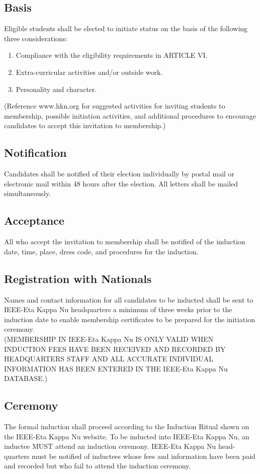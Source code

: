 \documentclass[10pt, oneside]{article}
\begin{document}
\subsection{Basis}
Eligible students shall be elected to initiate status on the basis of the
following three considerations:
\begin{enumerate}[label=\alph*.]
\item Compliance with the eligibility requirements in ARTICLE VI.
\item Extra-curricular activities and/or outside work.
\item Personality and character.
\end{enumerate}
(Reference www.hkn.org for suggested activities for inviting students to membership, possible initiation activities, and additional procedures to encourage candidates to accept this invitation to membership.)
\subsection{Notification}
Candidates shall be notified of their election individually by postal mail or electronic mail within 48 hours after the election. All letters shall be mailed simultaneously.
\subsection{Acceptance}
All who accept the invitation to membership shall be notified of the induction date, time, place, dress code, and procedures for the induction.
\subsection{Registration with Nationals}
Names and contact information for all candidates to be inducted shall be sent to IEEE-Eta Kappa Nu headquarters a minimum of three weeks prior to the induction date to enable membership certificates to be prepared for the initiation ceremony.
\\ (MEMBERSHIP IN IEEE-Eta Kappa Nu IS ONLY VALID WHEN INDUCTION FEES HAVE BEEN RECEIVED AND RECORDED BY HEADQUARTERS STAFF AND ALL ACCURATE INDIVIDUAL INFORMATION HAS BEEN ENTERED IN THE IEEE-Eta Kappa Nu DATABASE.)
\subsection{Ceremony} The formal induction shall proceed according to the Induction Ritual shown on the IEEE-Eta Kappa Nu website. To be inducted into IEEE-Eta Kappa Nu, an inductee MUST attend an induction ceremony. IEEE-Eta Kappa Nu head- quarters must be notified of inductees whose fees and information have been paid and recorded but who fail to attend the induction ceremony.
\end{document}
